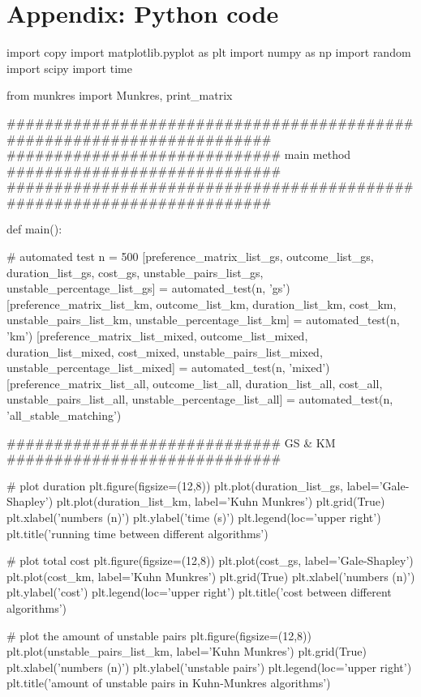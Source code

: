 \documentclass[14pt]{extarticle}
\begin{document}
\section*{Appendix: Python code} \label{GS_algorithm}
\begin{python} 
import copy
import matplotlib.pyplot as plt
import numpy as np
import random
import scipy
import time

from munkres import Munkres, print_matrix

#######################################################################
############################# main method #############################
#######################################################################

def main():
    
    # automated test
    n = 500
    [preference_matrix_list_gs, outcome_list_gs, duration_list_gs, cost_gs, unstable_pairs_list_gs, unstable_percentage_list_gs] = automated_test(n, 'gs')
    [preference_matrix_list_km, outcome_list_km, duration_list_km, cost_km, unstable_pairs_list_km, unstable_percentage_list_km] = automated_test(n, 'km')
    [preference_matrix_list_mixed, outcome_list_mixed, duration_list_mixed, cost_mixed, unstable_pairs_list_mixed, unstable_percentage_list_mixed] = automated_test(n, 'mixed')
    [preference_matrix_list_all, outcome_list_all, duration_list_all, cost_all, unstable_pairs_list_all, unstable_percentage_list_all] = automated_test(n, 'all_stable_matching')

    ############################# GS & KM #############################

    # plot duration 
    plt.figure(figsize=(12,8))
    plt.plot(duration_list_gs, label='Gale-Shapley')
    plt.plot(duration_list_km, label='Kuhn Munkres')
    plt.grid(True)
    plt.xlabel('numbers (n)')
    plt.ylabel('time (s)')
    plt.legend(loc='upper right')
    plt.title('running time between different algorithms') 

    # plot total cost
    plt.figure(figsize=(12,8))
    plt.plot(cost_gs, label='Gale-Shapley')
    plt.plot(cost_km, label='Kuhn Munkres')
    plt.grid(True)
    plt.xlabel('numbers (n)')
    plt.ylabel('cost')
    plt.legend(loc='upper right')
    plt.title('cost between different algorithms')  

    # plot the amount of unstable pairs
    plt.figure(figsize=(12,8))
    plt.plot(unstable_pairs_list_km, label='Kuhn Munkres')
    plt.grid(True)
    plt.xlabel('numbers (n)')
    plt.ylabel('unstable pairs')
    plt.legend(loc='upper right')
    plt.title('amount of unstable pairs in Kuhn-Munkres algorithms') 


\end{python}
\end{document}
